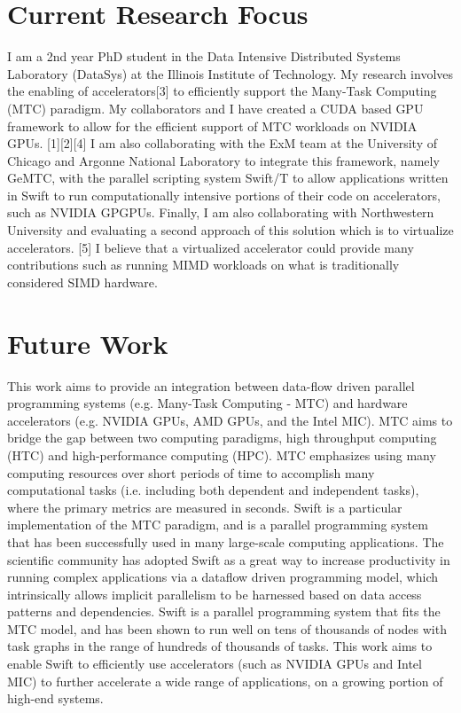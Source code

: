 \documentclass[conference]{IEEEtran}
\begin{document}
\section{Current Research Focus}
I am a 2nd year PhD student in the Data Intensive Distributed Systems Laboratory (DataSys) at the Illinois Institute of Technology. My research involves the enabling of accelerators[3] to efficiently support the Many-Task Computing (MTC) paradigm. My collaborators and I have created a CUDA based GPU framework to allow for the efficient support of MTC workloads on NVIDIA GPUs. [1][2][4] I am also collaborating with the ExM team at the University of Chicago and Argonne National Laboratory to integrate this framework, namely GeMTC, with the parallel scripting system Swift/T to allow applications written in Swift to run computationally intensive portions of their code on accelerators, such as NVIDIA GPGPUs. Finally, I am also collaborating with Northwestern University and evaluating a second approach of this solution which is to virtualize accelerators. [5] I believe that a virtualized accelerator could provide many contributions such as running MIMD workloads on what is traditionally considered SIMD hardware.
\section{Future Work}
This work aims to provide an integration between data-flow driven parallel programming systems (e.g. Many-Task Computing - MTC) and hardware accelerators \cite{kriederGCASR12} (e.g. NVIDIA GPUs, AMD GPUs, and the Intel MIC). MTC aims to bridge the gap between two computing paradigms, high throughput computing (HTC) and high-performance computing (HPC). MTC emphasizes using many computing resources over short periods of time to accomplish many computational tasks (i.e. including both dependent and independent tasks), where the primary metrics are measured in seconds.\cite{raicu2008toward} Swift is a particular implementation of the MTC paradigm, and is a parallel programming system that has been successfully used in many large-scale computing applications. \cite{zhao2007swift} The scientific community has adopted Swift as a great way to increase productivity in running complex applications via a dataflow driven programming model, which intrinsically allows implicit parallelism to be harnessed based on data access patterns and dependencies. Swift is a parallel programming system that fits the MTC model, and has been shown to run well on tens of thousands of nodes with task graphs in the range of hundreds of thousands of tasks. This work aims to enable Swift to efficiently use accelerators (such as NVIDIA GPUs and Intel MIC) to further accelerate a wide range of applications, on a growing portion of high-end systems.
\end{document}
